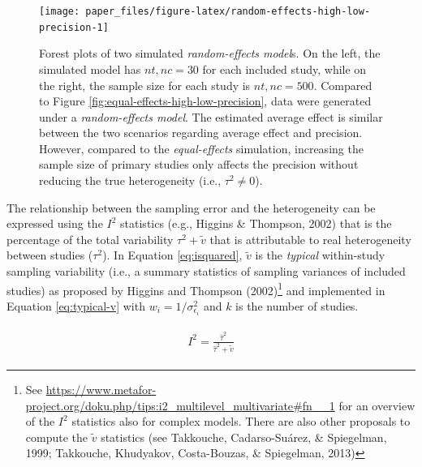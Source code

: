 \documentclass[
  man,floatsintext]{apa6}
\begin{document}
\scriptsize

\begin{figure}[H]

{\centering \texttt{[image: paper\_files/figure-latex/random-effects-high-low-precision-1]} 

}

\caption{\color{red} Forest plots of two simulated \emph{random-effects model}s. On the left, the simulated model has \(nt,nc = 30\) for each included study, while on the right, the sample size for each study is \(nt,nc = 500\). Compared to Figure \ref{fig:equal-effects-high-low-precision}, data were generated under a \emph{random-effects model}. The estimated average effect is similar between the two scenarios regarding average effect and precision. However, compared to the \emph{equal-effects} simulation, increasing the sample size of primary studies only affects the precision without reducing the true heterogeneity (i.e., \(\tau^{2} \neq 0\)). \color{black}}\label{fig:random-effects-high-low-precision}
\end{figure}

\normalsize

The relationship between the sampling error and the heterogeneity can be expressed using the \(I^{2}\) statistics (e.g., Higgins \& Thompson, 2002) that is the percentage of the total variability \(\tau^{2} + \tilde{v}\) that is attributable to real heterogeneity between studies (\(\tau^{2}\)). \color{red} In Equation \eqref{eq:isquared}, \(\tilde{v}\) is the \emph{typical} within-study sampling variability (i.e., a summary statistics of sampling variances of included studies) as proposed by Higgins and Thompson (2002)\footnote{See \url{https://www.metafor-project.org/doku.php/tips:i2_multilevel_multivariate\#fn__1} for an overview of the \(I^2\) statistics also for complex models. There are also other proposals to compute the \(\tilde{v}\) statistics (see Takkouche, Cadarso-Suárez, \& Spiegelman, 1999; Takkouche, Khudyakov, Costa-Bouzas, \& Spiegelman, 2013)} and implemented in Equation \eqref{eq:typical-v} with \(w_i = 1/\sigma_{\epsilon_i}^{2}\) and \(k\) is the number of studies. \color{black}

\begin{align}
\begin{gathered}
I^2 = \frac{\hat{\tau}^2}{\hat{\tau}^2 + \tilde{v}}
\label{eq:isquared}
\end{gathered}
\end{align}

\color{red}
\end{document}
